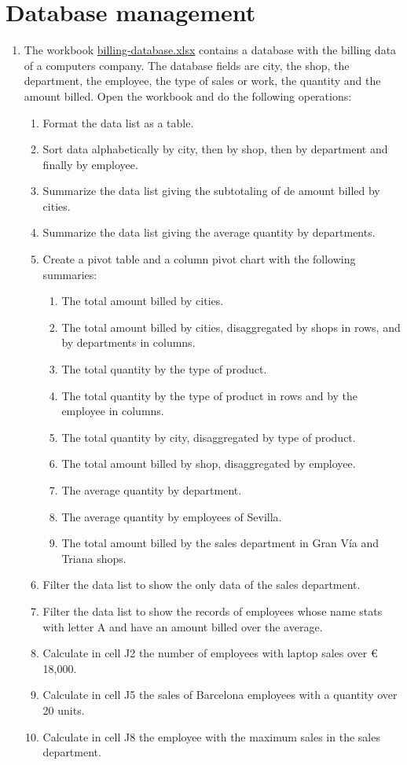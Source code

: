 
\section{Database management}
\begin{enumerate}[leftmargin=*,resume]
\item The workbook
\href{http://aprendeconalf.es/office/excel/exercises/databases/billing-database.xlsx}{\textsf{billing-database.xlsx}}
contains a database with the billing data of a computers company.
The database fields are city, the shop, the department, the employee, the type of sales or work, the quantity and the
amount billed. 
Open the workbook and do the following operations:
\begin{enumerate}
\item Format the data list as a table.
\item Sort data alphabetically by city, then by shop, then by department and finally by employee.
\item Summarize the data list giving the subtotaling of de amount billed by cities. 
\item Summarize the data list giving the average quantity by departments. 
\item Create a pivot table and a column pivot chart with the following summaries: 
\begin{enumerate}
\item The total amount billed by cities.  
\item The total amount billed by cities, disaggregated by shops in rows, and by departments in columns.  
\item The total quantity by the type of product. 
\item The total quantity by the type of product in rows and by the employee in columns.  
\item The total quantity by city, disaggregated by type of product. 
\item The total amount billed by shop, disaggregated by employee.
\item The average quantity by department. 
\item The average quantity by employees of Sevilla. 
\item The total amount billed by the sales department in Gran Vía and Triana shops.    
\end{enumerate}
\item Filter the data list to show the only data of the sales department.
\item Filter the data list to show the records of employees whose name stats with letter A and have an amount
billed over the average.
\item Calculate in cell J2 the number of employees with laptop sales over € 18,000.  
\item Calculate in cell J5 the sales of Barcelona employees with a quantity over 20 units. 
\item Calculate in cell J8 the employee with the maximum sales in the sales department.
\end{enumerate}



\end{enumerate}

